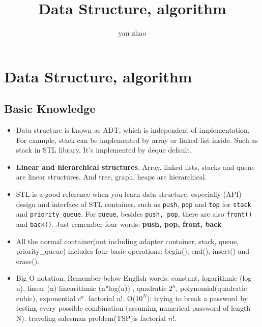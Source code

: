 \documentclass[a4paper,11pt,twoside]{book}
\begin{document}
\title{Data Structure, algorithm}
\author{yan zhao}
\date{}\maketitle

\setcounter{secnumdepth}{4}
\setcounter{tocdepth}{4}
\tableofcontents


\chapter{Data Structure, algorithm} 


\section{Basic Knowledge}
\begin{itemize}
\item Data structure is known as ADT,  which is independent of implementation. For example, stack can be implemented by array or linked list inside. Such as stack in STL library, It's implemented by deque default.   

\item \textbf{Linear and hierarchical structures}. Array, linked lists, stacks and queue are linear structures. And tree, graph, heaps are hierarchical.

\item STL is a good reference when you learn data structure, especially (API) design and interface of STL container. such as \texttt{push}, \texttt{pop}  and \texttt{top} for \texttt{stack} and \texttt{priority\_queue}. For \texttt{queue}, besides \texttt{push, pop},  there are also \texttt{front()} and \texttt{back()}. Just remember four words: \textbf{push, pop, front, back}

\item All the normal container(not including adapter container, stack, queue, priority\_queue) includes four basic operations: begin(), end(), insert() and erase(). 

\item Big O notation. Remember below English words: constant, logarithmic (log n), linear (n)  linearithmic (n*log(n)) , quadratic $2^{n}$, polynomial(quadratic cubic),  exponential $c^{n}$.  factorial $n!$.  O($10^{N}$): trying to break a password by testing every possible combination (assuming numerical password of length N).  traveling salesman problem(TSP)is factorial $n!$. 
\end{itemize}
\end{document}

